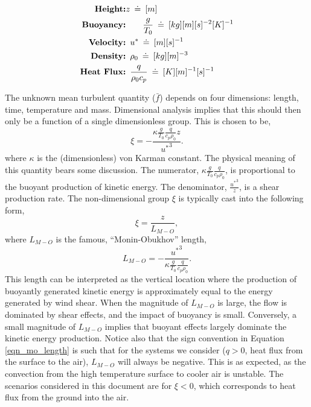\begin{eqnarray}
 \textbf{Height:}& z\enskip \dot = \enskip [m]  \\
 \textbf{Buoyancy:}& \qquad \frac{g}{T_0}\enskip \dot = \enskip [kg] [m] [s]^{-2}
  [K]^{-1} \\ 
 \textbf{Velocity:}& \enskip u^* \enskip \dot = \enskip [m] [s]^{-1} \\
  \textbf{Density:}&  \enskip \rho_0 \enskip \dot = \enskip [kg] [m]^{-3}  \\
 \textbf{Heat Flux:}& \enskip \frac{q}{\rho_0 c_p} \enskip \dot = \enskip [K] [m]^{-1} [s]^{-1} \\
\end{eqnarray}

The unknown mean turbulent quantity ($\bar f$) depends on four
dimensions: length, time, temperature and mass. Dimensional analysis
implies that this should then only be a function of a single dimensionless
group\cite{munson2012fundamentals}. This is chosen to be,
\begin{equation}
 \xi = -\frac{\kappa \frac{g}{T_0} \frac{q}{c_p \rho_0} z}{ {u^*}^3}.
\end{equation}
where $\kappa$ is the (dimensionless) von Karman constant. 
The physical meaning of this quantity bears some discussion.  
The numerator, $\kappa \frac{g}{T_0} \frac{q}{c_p \rho_0} $, is
proportional to the buoyant production of kinetic energy.  The
denominator, $\frac{{u^*}^3}{z}$, is a shear production rate. 
%
The non-dimensional group $\xi$ is typically cast into the following 
form, 
\begin{equation}
 \xi = \frac{z}{L_{M-O}},
\end{equation}
where $L_{M-O}$ is the famous, ``Monin-Obukhov'' length,
\begin{equation}
 L_{M-O} = -\frac{{u^*}^3}{\kappa \frac{g}{T_0} \frac{q}{c_p \rho_0}}. 
  \label{eqn_mo_length}
\end{equation}
%
This length can be interpreted as the vertical location
where the production of buoyantly generated kinetic energy is
approximately equal to the energy generated by wind shear. When the
magnitude of $L_{M-O}$ is large, the flow is dominated by shear effects,
and the impact of buoyancy is small. Conversely, a small magnitude of
$L_{M-O}$ implies that buoyant effects largely dominate the kinetic
energy production. Notice also that the sign convention in Equation
\ref{eqn_mo_length} is such that for the systems we consider ($q > 0$, heat
flux from the surface to the air), $L_{M-O}$ will always be
negative. This is as expected, as the convection from the high
temperature surface to cooler air is unstable. 
The scenarios considered in this document are for $\xi<0$, which
corresponds to heat flux from the ground into the air. 

